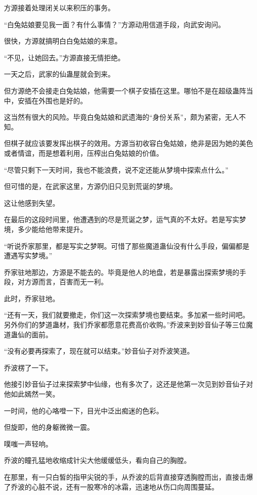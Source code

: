 
\begin{this_body}

方源接着处理闭关以来积压的事务。

“白兔姑娘要见我一面？有什么事情？”方源动用信道手段，向武安询问。

很快，方源就搞明白白兔姑娘的来意。

“不见，让她回去。”方源直接无情拒绝。

一天之后，武家的仙蛊屋就会到来。

但方源绝不会接走白兔姑娘，他需要一个棋子安插在这里。哪怕不是在超级蛊阵当中，安插在外围也是好的。

这当然有很大的风险。毕竟白兔姑娘和武遗海的“身份关系”，颇为紧密，无人不知。

但棋子就应该要发挥出棋子的效用。方源当初收容白兔姑娘，绝非是因为她的美色或者情谊，而是想着利用，压榨出白兔姑娘的价值。

“尽管只剩下一天时间，我也不能浪费，说不定还能从梦境中探索点什么。”

但可惜的是，在武家这里，方源仍旧只见到荒诞的梦境。

这让他感到失望。

在最后的这段时间里，他遭遇到的尽是荒诞之梦，运气真的不太好。若是写实梦境，多少能给他带来提升。

“听说乔家那里，都是写实之梦啊。可惜了那些魔道蛊仙没有什么手段，偏偏都是遭遇写实梦境。”

乔家驻地那边，方源是不能去的。毕竟是他人的地盘，若是暴露出探索梦境的手段，对方源而言，百害而无一利。

此时，乔家驻地。

“还有一天，我们就要撤走，你们这一次探索梦境也要结束。多加紧一些时间吧。另外你们的梦道蛊材，我们乔家都愿意花费高价收购。”乔波来到妙音仙子等三位魔道蛊仙的面前。

“没有必要再探索了，现在就可以结束。”妙音仙子对乔波笑道。

乔波楞了一下。

他接引妙音仙子过来探索梦中仙缘，也有多次了，这还是他第一次见到妙音仙子对他如此嫣然一笑。

一时间，他的心咯噔一下，目光中泛出痴迷的色彩。

但旋即，他的身躯微微一震。

噗嗤一声轻响。

乔波的瞳孔猛地收缩成针尖大他缓缓低头，看向自己的胸膛。

在那里，有一只白皙的指甲尖锐的手，从乔波的后背直接穿透胸膛而出，直接击爆了乔波的心脏不说，还有一股寒冷的冰霜，迅速地从伤口向周围蔓延。


\end{this_body}

